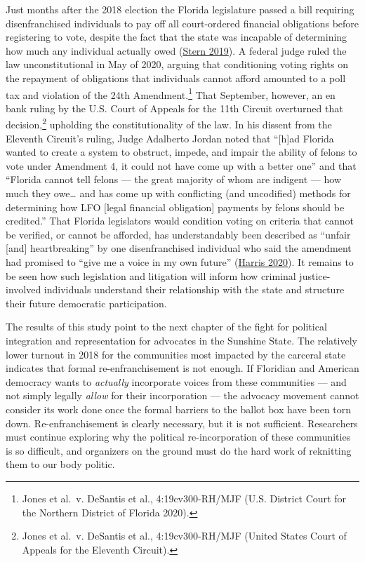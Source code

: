 \documentclass[
  12pt,
]{article}
\begin{document}
Just months after the 2018 election the Florida legislature passed a bill requiring disenfranchised individuals to pay off all court-ordered financial obligations before registering to vote, despite the fact that the state was incapable of determining how much any individual actually owed (\protect\hyperlink{ref-Stern2019}{Stern 2019}). A federal judge ruled the law unconstitutional in May of 2020, arguing that conditioning voting rights on the repayment of obligations that individuals cannot afford amounted to a poll tax and violation of the 24th Amendment.\footnote{Jones et al.~v. DeSantis et al., 4:19cv300-RH/MJF (U.S. District Court for the Northern District of Florida 2020).} That September, however, an en bank ruling by the U.S. Court of Appeals for the 11th Circuit overturned that decision,\footnote{Jones et al.~v. DeSantis et al., 4:19cv300-RH/MJF (United States Court of Appeals for the Eleventh Circuit).} upholding the constitutionality of the law. In his dissent from the Eleventh Circuit's ruling, Judge Adalberto Jordan noted that ``{[}h{]}ad Florida wanted to create a system to obstruct, impede, and impair the ability of felons to vote under Amendment 4, it could not have come up with a better one'' and that ``Florida cannot tell felons --- the great majority of whom are indigent --- how much they owe\ldots{} and has come up with conflicting (and uncodified) methods for determining how LFO {[}legal financial obligation{]} payments by felons should be credited.'' That Florida legislators would condition voting on criteria that cannot be verified, or cannot be afforded, has understandably been described as ``unfair {[}and{]} heartbreaking'' by one disenfranchised individual who said the amendment had promised to ``give me a voice in my own future'' (\protect\hyperlink{ref-Harris2020}{Harris 2020}). It remains to be seen how such legislation and litigation will inform how criminal justice-involved individuals understand their relationship with the state and structure their future democratic participation.

The results of this study point to the next chapter of the fight for political integration and representation for advocates in the Sunshine State. The relatively lower turnout in 2018 for the communities most impacted by the carceral state indicates that formal re-enfranchisement is not enough. If Floridian and American democracy wants to \emph{actually} incorporate voices from these communities --- and not simply legally \emph{allow} for their incorporation --- the advocacy movement cannot consider its work done once the formal barriers to the ballot box have been torn down. Re-enfranchisement is clearly necessary, but it is not sufficient. Researchers must continue exploring why the political re-incorporation of these communities is so difficult, and organizers on the ground must do the hard work of reknitting them to our body politic.
\end{document}
